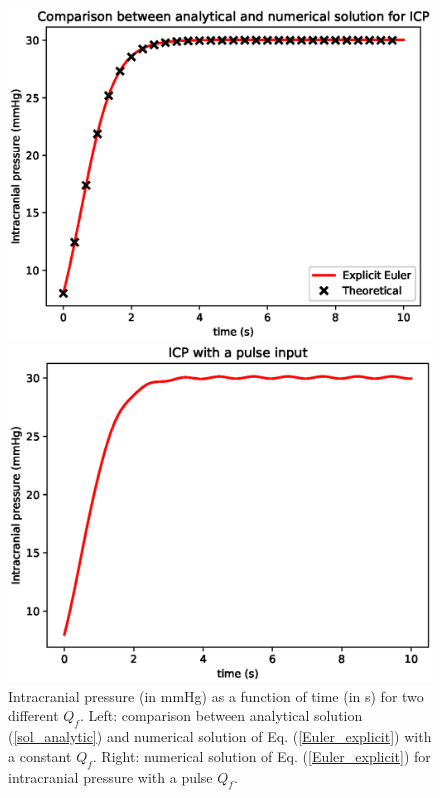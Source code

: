 \documentclass{config}
\begin{document}
\begin{figure}[H]
\begin{minipage}{.48\textwidth}
\includegraphics[scale=0.55]{icp_constant.eps}
\end{minipage} \hfill
\begin{minipage}{.48\textwidth}
\includegraphics[scale=0.55]{icp_pulse.eps}
\end{minipage}
\caption{Intracranial pressure (in mmHg) as a function of time (in s) for two different $Q_f$. Left: comparison between analytical solution (\ref{sol_analytic}) and numerical solution of Eq. (\ref{Euler_explicit}) with a constant $Q_f$. Right: numerical solution of Eq. (\ref{Euler_explicit}) for intracranial pressure with a pulse $Q_f$. }
\end{figure}
\end{document}
